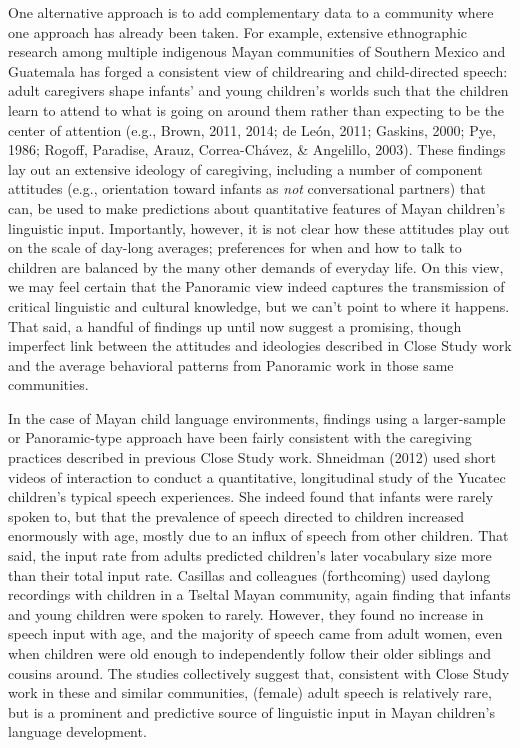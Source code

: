 \documentclass[,man,floatsintext]{apa6}
\begin{document}
One alternative approach is to add complementary data to a community
where one approach has already been taken. For example, extensive
ethnographic research among multiple indigenous Mayan communities of
Southern Mexico and Guatemala has forged a consistent view of
childrearing and child-directed speech: adult caregivers shape infants'
and young children's worlds such that the children learn to attend to
what is going on around them rather than expecting to be the center of
attention (e.g., Brown, 2011, 2014; de León, 2011; Gaskins, 2000; Pye,
1986; Rogoff, Paradise, Arauz, Correa-Chávez, \& Angelillo, 2003). These
findings lay out an extensive ideology of caregiving, including a number
of component attitudes (e.g., orientation toward infants as \emph{not}
conversational partners) that can, be used to make predictions about
quantitative features of Mayan children's linguistic input. Importantly,
however, it is not clear how these attitudes play out on the scale of
day-long averages; preferences for when and how to talk to children are
balanced by the many other demands of everyday life. On this view, we
may feel certain that the Panoramic view indeed captures the
transmission of critical linguistic and cultural knowledge, but we can't
point to where it happens. That said, a handful of findings up until now
suggest a promising, though imperfect link between the attitudes and
ideologies described in Close Study work and the average behavioral
patterns from Panoramic work in those same communities.

In the case of Mayan child language environments, findings using a
larger-sample or Panoramic-type approach have been fairly consistent
with the caregiving practices described in previous Close Study work.
Shneidman (2012) used short videos of interaction to conduct a
quantitative, longitudinal study of the Yucatec children's typical
speech experiences. She indeed found that infants were rarely spoken to,
but that the prevalence of speech directed to children increased
enormously with age, mostly due to an influx of speech from other
children. That said, the input rate from adults predicted children's
later vocabulary size more than their total input rate. Casillas and
colleagues (forthcoming) used daylong recordings with children in a
Tseltal Mayan community, again finding that infants and young children
were spoken to rarely. However, they found no increase in speech input
with age, and the majority of speech came from adult women, even when
children were old enough to independently follow their older siblings
and cousins around. The studies collectively suggest that, consistent
with Close Study work in these and similar communities, (female) adult
speech is relatively rare, but is a prominent and predictive source of
linguistic input in Mayan children's language development.
\end{document}
